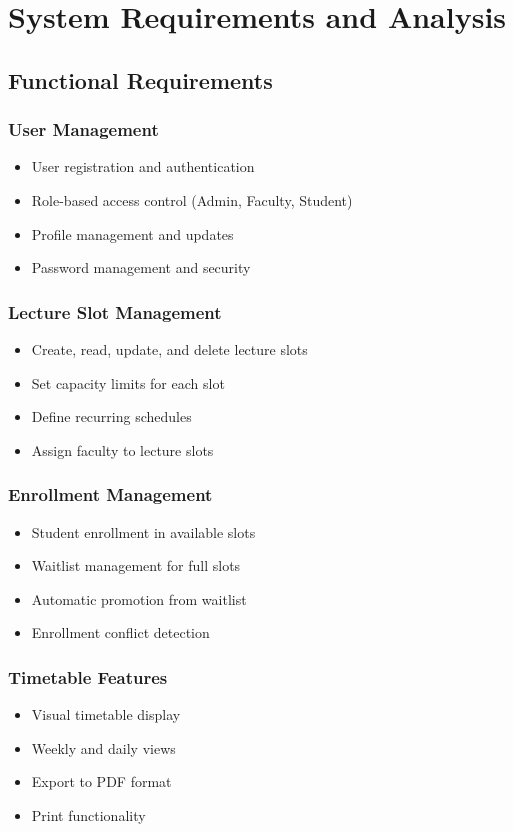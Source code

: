 \documentclass[12pt,a4paper]{report}
\begin{document}
\chapter{System Requirements and Analysis}

\section{Functional Requirements}

\subsection{User Management}
\begin{itemize}[leftmargin=*]
    \item User registration and authentication
    \item Role-based access control (Admin, Faculty, Student)
    \item Profile management and updates
    \item Password management and security
\end{itemize}

\subsection{Lecture Slot Management}
\begin{itemize}[leftmargin=*]
    \item Create, read, update, and delete lecture slots
    \item Set capacity limits for each slot
    \item Define recurring schedules
    \item Assign faculty to lecture slots
\end{itemize}

\subsection{Enrollment Management}
\begin{itemize}[leftmargin=*]
    \item Student enrollment in available slots
    \item Waitlist management for full slots
    \item Automatic promotion from waitlist
    \item Enrollment conflict detection
\end{itemize}

\subsection{Timetable Features}
\begin{itemize}[leftmargin=*]
    \item Visual timetable display
    \item Weekly and daily views
    \item Export to PDF format
    \item Print functionality
\end{itemize}
\end{document}
